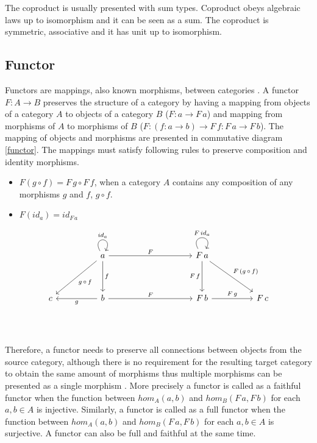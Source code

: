\documentclass[article]{aaltoseries}
\begin{document}
    The coproduct is usually presented with sum types. Coproduct obeys algebraic
    laws up to isomorphism and it can be seen as a sum. The coproduct is
    symmetric, associative and it has unit up to isomorphism.
    

  \subsection{Functor}
    Functors are mappings, also known morphisms, between categories
    \cite{computational, barr1990category, mac2013categories}. A functor $F: A
    \rightarrow B$ preserves the structure of a category by having a mapping
    from objects of a category $A$ to objects of a category $B$ ($F: a
    \rightarrow F\, a$) and mapping from morphisms of $A$ to morphisms of $B$
    ($F: (f: a \rightarrow b) \rightarrow F\, f: F\, a \rightarrow F\, b$). The
    mapping of objects and morphisms are presented in commutative diagram
    \ref{functor}. The mappings must satisfy following rules to preserve
    composition and identity morphisms.

    \begin{itemize}
      \item $F(g \circ f) = F\, g \circ F\, f$, when a category $A$ contains any
        composition of any morphisms $g$ and $f$, $g \circ f$.
      \item $F(id_a) = id_{F\, a}$
    \end{itemize}

    \begin{equation}
      \label{functor}
      \begin{tikzcd}[row sep=huge, column sep=huge]
        & a \arrow[d, "f"] \arrow[dl, "g\, \circ\, f"] \arrow[r, "F"] \arrow[loop, distance=2em, in=60, out=120, "id_a"]
        &[5em] F\, a \arrow[d, "F\, f"'] \arrow[dr, "F\, (g\, \circ\, f)"]
                   \arrow[loop, distance=2em, in=60, out=120, "F\, id_a"]
        & \\
        c
        & b \arrow[l, "g"] \arrow[r, "F"]
        & F\, b \arrow[r, "F\, g"]
        & F\, c \\
      \end{tikzcd}
    \end{equation}

    Therefore, a functor needs to preserve all connections between objects from
    the source category, although there is no requirement for the resulting
    target category to obtain the same amount of morphisms thus multiple
    morphisms can be presented as a single morphism \cite{computational,
      barr1990category}. More precisely a functor is called as a faithful
    functor when the function between $hom_A(a, b)$ and $hom_B(F\, a, F\, b)$ for
    each $a, b \in A$ is injective. Similarly, a functor is called as a full
    functor when the function between $hom_A(a, b)$ and $hom_B(F\, a, F\, b)$ for
    each $a, b \in A$ is surjective. A functor can also be full and faithful at
    the same time.
 
\end{document}
